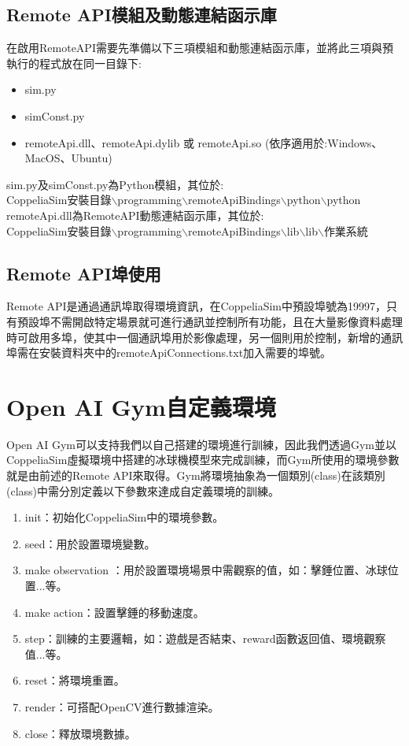 \subsection{Remote API模組及動態連結函示庫}
在啟用RemoteAPI需要先準備以下三項模組和動態連結函示庫，並將此三項與預執行的程式放在同一目錄下:
\begin{itemize}
\item sim.py
\item simConst.py
\item remoteApi.dll、remoteApi.dylib 或 remoteApi.so (依序適用於:Windows、MacOS、Ubuntu)
\end{itemize}
sim.py及simConst.py為Python模組，其位於:\\
CoppeliaSim安裝目錄$\backslash$programming$\backslash$remoteApiBindings$\backslash$python$\backslash$python\\
remoteApi.dll為RemoteAPI動態連結函示庫，其位於:\\
CoppeliaSim安裝目錄$\backslash$programming$\backslash$remoteApiBindings$\backslash$lib$\backslash$lib$\backslash$作業系統\\
\subsection{Remote API埠使用}
Remote API是通過通訊埠取得環境資訊，在CoppeliaSim中預設埠號為19997，只有預設埠不需開啟特定場景就可進行通訊並控制所有功能，且在大量影像資料處理時可啟用多埠，使其中一個通訊埠用於影像處理，另一個則用於控制，新增的通訊埠需在安裝資料夾中的remoteApiConnections.txt加入需要的埠號。\\
\section{Open AI Gym自定義環境}
Open AI Gym可以支持我們以自己搭建的環境進行訓練，因此我們透過Gym並以CoppeliaSim虛擬環境中搭建的冰球機模型來完成訓練，而Gym所使用的環境參數就是由前述的Remote API來取得。Gym將環境抽象為一個類別(class)在該類別(class)中需分別定義以下參數來達成自定義環境的訓練。\\

\begin{enumerate}
\item init：初始化CoppeliaSim中的環境參數。
\item seed：用於設置環境變數。
\item make observation ：用於設置環境場景中需觀察的值，如：擊錘位置、冰球位置...等。
\item make action：設置擊錘的移動速度。
\item step：訓練的主要邏輯，如：遊戲是否結束、reward函數返回值、環境觀察值...等。
\item reset：將環境重置。
\item render：可搭配OpenCV進行數據渲染。
\item close：釋放環境數據。\\
\end{enumerate}

